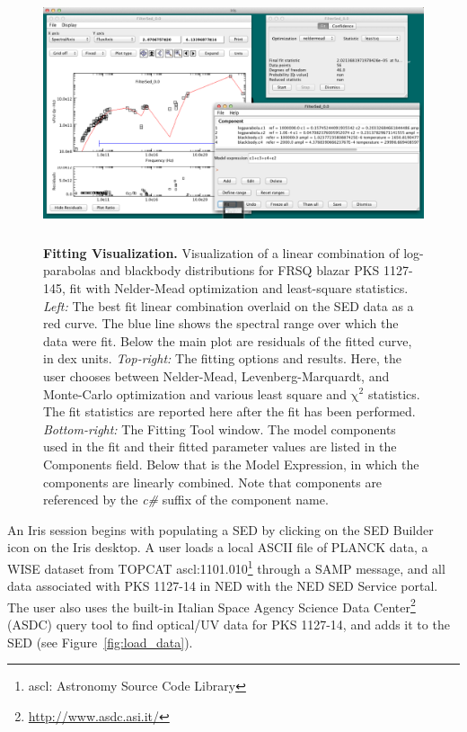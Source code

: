 \documentclass[preprint,authoryear,5p]{elsarticle}
\begin{document}
\begin{figure} \centering
\includegraphics[height=2.95in,width=5.3in]{fitting-1.pdf}
\caption{\textbf{Fitting Visualization.}  Visualization of a linear combination of
log-parabolas and blackbody distributions for FRSQ blazar PKS 1127-145, fit with
Nelder-Mead optimization and least-square statistics. \textit{Left:} The best fit
linear combination overlaid on the SED data as a red curve. The blue line shows
the spectral range over which the data were fit. Below the main plot are
residuals of the fitted curve, in dex units. \textit{Top-right:} The fitting
options and results. Here, the user chooses between Nelder-Mead,
Levenberg-Marquardt, and Monte-Carlo \citep[Differential Evolution, ][]{Storn:1997:DEN:596061.596146}
optimization and various least square and
$\mathrm{\chi}^{2}$ statistics. The fit statistics are reported here after the
fit has been performed. \textit{Bottom-right:} The Fitting Tool window. The
model components used in the fit and their fitted parameter values are listed in
the Components field. Below that is the Model Expression, in which the
components are linearly combined. Note that components are referenced by the
\textit{c\#} suffix of the component name.} \label{fig:fitting1} \end{figure}

\begin{sloppypar}
An Iris session begins with populating a SED by clicking on the SED Builder icon on the
Iris desktop. A user loads a local ASCII file of
PLANCK data, a WISE dataset from TOPCAT ascl:1101.010\footnote{ascl: Astronomy Source Code Library} \citep{2005ASPC..347...29T} 
through a SAMP message, and all data associated with PKS 1127-14 in NED with the NED SED
Service portal. The user also uses the built-in Italian Space Agency Science Data
Center\footnote{\url{http://www.asdc.asi.it/}} (ASDC) query tool to find
optical/UV data for PKS 1127-14, and adds it to the SED (see
Figure~\ref{fig:load_data}).
\end{sloppypar}
\end{document}
